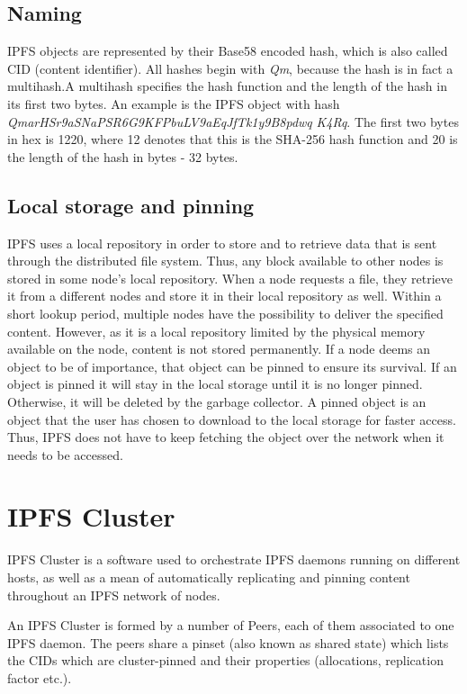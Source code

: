 \documentclass[12pt]{report}
\begin{document}
\subsection{Naming}

IPFS objects are represented by their Base58 encoded hash, which is also called CID (content identifier). All hashes begin with \textit{Qm}, because the hash is in fact a multihash.A multihash specifies the hash function and the length of the hash in its first two bytes. An example is the IPFS object with hash \textit{QmarHSr9aSNaPSR6G9KFPbuLV9aEqJfTk1y9B8pdwq} \textit{K4Rq}. The first two bytes in hex is 1220, where 12 denotes that this is the SHA-256 hash function and 20 is the length of the hash in bytes - 32 bytes.

\subsection{Local storage and pinning}

IPFS uses a local repository in order to store and to retrieve data that is sent through the distributed file system. Thus, any block available to other nodes is stored in some node’s local repository. When a node requests a file, they retrieve it from a different nodes and store it in their local repository as well. Within a short lookup period, multiple nodes have the possibility to deliver the specified content. However, as it is a local repository limited by the physical memory available on the node, content is not stored permanently. If a node deems an object to be of importance, that object can be pinned to ensure its survival. If an object is pinned it will stay in the local storage until it is no longer pinned. Otherwise, it will be deleted by the garbage collector. A pinned object is an object that the user has chosen to download to the local storage for faster access. Thus, IPFS does not have to keep fetching the object over the network when it needs to be accessed.

\section{IPFS Cluster}

IPFS Cluster \cite{ipfscluster} is a software used to orchestrate IPFS daemons running on different hosts, as well as a mean of automatically replicating and pinning content throughout an IPFS network of nodes. 

An IPFS Cluster is formed by a number of Peers, each of them associated to one IPFS daemon. The peers share a pinset (also known as shared state) which lists the CIDs which are cluster-pinned and their properties (allocations, replication factor etc.).
\end{document}
